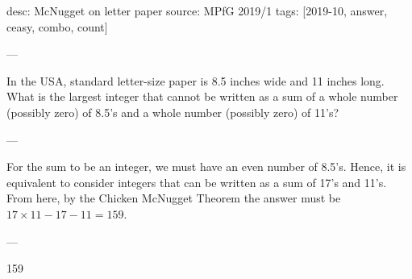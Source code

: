 desc: McNugget on letter paper
source: MPfG 2019/1
tags: [2019-10, answer, ceasy, combo, count]

---

In the USA, standard letter-size paper is 8.5 inches wide and 11 inches long. What is the largest integer that cannot be written as a sum of a whole number (possibly zero) of 8.5's and a whole number (possibly zero) of 11's?

---

For the sum to be an integer, we must have an even number of 8.5's. Hence, it is equivalent to consider integers that can be written as a sum of 17's and 11's. From here, by the Chicken McNugget Theorem the answer must be $17\times11-17-11=159$.

---

159
